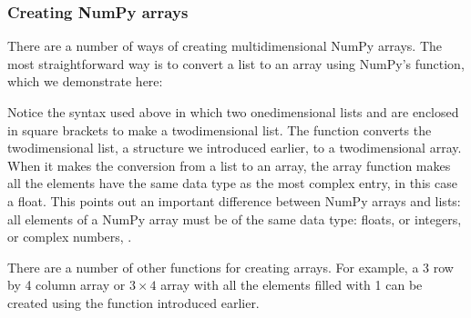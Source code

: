 \documentclass[letterpaper,10pt,english]{sphinxmanual}
\begin{document}
\subsubsection{Creating NumPy arrays}
\label{\detokenize{chap3/chap3_arrays:creating-numpy-arrays}}
\sphinxAtStartPar
There are a number of ways of creating multidimensional NumPy arrays.  The most straightforward way is to convert a list to an array using NumPy’s  function, which we demonstrate here:

\begin{sphinxVerbatim}[commandchars=\\\{\},numbers=left,firstnumber=1,stepnumber=1]
  \PYG{p}{[}\PYG{p}{[}  \PYG{p}{]} \PYG{p}{[}  \PYG{p}{]}\PYG{p}{]}

\PYG{p}{[}\PYG{p}{[}  \PYG{p}{]}
\PYG{g+go}{                [9., 7., 4.]])}
\end{sphinxVerbatim}

\sphinxAtStartPar
Notice the syntax used above in which two one\sphinxhyphen{}dimensional lists \sphinxcode{\sphinxupquote{{[}1., 4, 5{]}}} and \sphinxcode{\sphinxupquote{{[}9, 7, 4{]}}} are enclosed in square brackets to make a two\sphinxhyphen{}dimensional list.  The  function converts the two\sphinxhyphen{}dimensional list, a structure we introduced earlier, to a two\sphinxhyphen{}dimensional array.  When it makes the conversion from a list to an array, the array function makes all the elements have the same data type as the most complex entry, in this case a float.  This points out an important difference between NumPy arrays and lists: all elements of a NumPy array must be of the same data type: floats, or integers, or complex numbers, .

\sphinxAtStartPar
There are a number of other functions for creating arrays.  For example, a 3 row by 4 column array or \(3 \times 4\) array with all the elements filled with 1 can be created using the  function introduced earlier.

\begin{sphinxVerbatim}[commandchars=\\\{\},numbers=left,firstnumber=1,stepnumber=1]
   

\PYG{p}{[}\PYG{p}{[}    \PYG{p}{]}
\PYG{g+go}{                [ 1., 1., 1., 1.]])}
\end{sphinxVerbatim}
\end{document}
